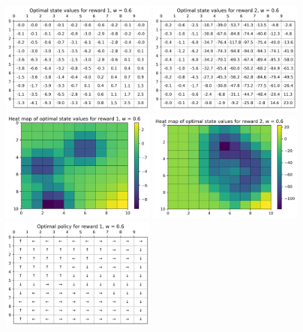 \begin{figure}[!htb]
\centering
  \includegraphics[width=0.49\textwidth]{images/Q9/Optimal-state-values-for-reward-1,-w-=-0.6.png}
  \includegraphics[width=0.49\textwidth]{images/Q9/Optimal-state-values-for-reward-2,-w-=-0.6.png}
  \includegraphics[width=0.49\textwidth]{images/Q9/Heat-map-of-optimal-state-values-for-reward-1,-w-=-0.6.png}
  \includegraphics[width=0.49\textwidth]{images/Q9/Heat-map-of-optimal-state-values-for-reward-2,-w-=-0.6.png}
  \includegraphics[width=0.49\textwidth]{images/Q9/Optimal-policy-for-reward-1,-w-=-0.6.png}

\end{figure}
